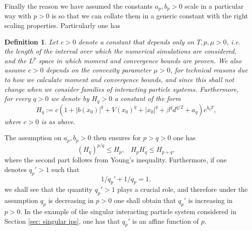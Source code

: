 \documentclass{article}
\newtheorem{defn}{Definition}
\newcommand{\pierre}[1]{\textcolor{blue}{#1}}
\begin{document}
Finally the reason we have assumed the constants $a_p,b_p>0$ scale in a particular way with $p>0$ is so that we can collate them in a generic constant with the right scaling properties. Particularly one has
\begin{defn}\label{defn: generic constant}
Let $c>0$ denote  a constant that depends only on $T,p,\mu>0$, i.e. the length of the interval over which the numerical simulations are considered, and the $L^p$ space in which moment and convergence bounds are proven. We also assume $c>0$ depends on the convexity parameter $\mu>0$, for technical reasons due to how we calculate moment and convergence bounds, and since this shall not change when we consider families of interacting particle systems. Furthermore, for every $q>0$ we denote by $H_q>0$ a constant of the form
\begin{equation}\label{eq: H_p defn}
    H_q:=c(1+\lvert b(x_0)\rvert^q+V(x_0)^q+\lvert x_0\rvert^q+\beta^{q}d^{q/2} +a_q)e^{b_q T},
\end{equation}
where $c>0$ is as above.
\end{defn}
The assumption on $a_p,b_p>0$ then ensures for $p>q>0$ one has
\begin{equation}\label{eq: constant condition}
    (H_q)^{p/q}\leq H_p,\;\;\;H_pH_{q}\leq H_{p+q},
\end{equation}
where the second part follows from Young's inequality. Furthermore, if one denotes $q_p'>1$ such that
\begin{equation}\label{eq: qp' defn}
   1/ q_p'+1/q_p=1,
\end{equation}
we shall see that the quantity $q_p'>1$ plays a crucial role, and therefore under the assumption $q_p$ is decreasing in $p>0$ one shall obtain that $q_p'$ is increasing in $p>0$. In the example of the singular interacting particle system considered in Section \ref{sec: singular ips}, one has that $q_{p}'$ is an affine function of $p$. 
\end{document}
